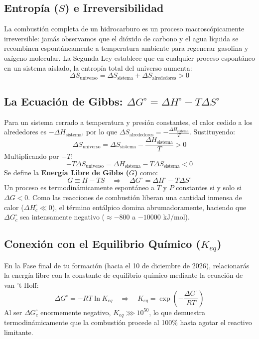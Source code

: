 \documentclass[11pt,letterpaper]{report}
\begin{document}
\subsection{Entropía ($S$) e Irreversibilidad}
La combustión completa de un hidrocarburo es un proceso macroscópicamente irreversible: jamás observamos que el dióxido de carbono y el agua líquida se recombinen espontáneamente a temperatura ambiente para regenerar gasolina y oxígeno molecular. La Segunda Ley establece que en cualquier proceso espontáneo en un sistema aislado, la entropía total del universo aumenta:
\begin{equation}
    \Delta S_{\text{universo}} = \Delta S_{\text{sistema}} + \Delta S_{\text{alrededores}} > 0
\end{equation}

\subsection{La Ecuación de Gibbs: $\Delta G^\circ = \Delta H^\circ - T\Delta S^\circ$}
Para un sistema cerrado a temperatura y presión constantes, el calor cedido a los alrededores es $-\Delta H_{\text{sistema}}$, por lo que $\Delta S_{\text{alrededores}} = -\frac{\Delta H_{\text{sistema}}}{T}$. Sustituyendo:
\begin{equation}
    \Delta S_{\text{universo}} = \Delta S_{\text{sistema}} - \frac{\Delta H_{\text{sistema}}}{T} > 0
\end{equation}
Multiplicando por $-T$:
\begin{equation}
    -T \Delta S_{\text{universo}} = \Delta H_{\text{sistema}} - T \Delta S_{\text{sistema}} < 0
\end{equation}
Se define la \textbf{Energía Libre de Gibbs ($G$)} como:
\begin{equation}
    G \equiv H - TS \quad \Longrightarrow \quad \Delta G^\circ = \Delta H^\circ - T\Delta S^\circ
\end{equation}
Un proceso es termodinámicamente espontáneo a $T$ y $P$ constantes si y solo si $\Delta G < 0$. Como las reacciones de combustión liberan una cantidad inmensa de calor ($\Delta H_c^\circ \ll 0$), el término entálpico domina abrumadoramente, haciendo que $\Delta G_c^\circ$ sea intensamente negativo ($\approx -800$ a $-10000\text{ kJ/mol}$).

\subsection{Conexión con el Equilibrio Químico ($K_{eq}$)}
En la Fase final de tu formación (hacia el 10 de diciembre de 2026), relacionarás la energía libre con la constante de equilibrio químico mediante la ecuación de van 't Hoff:
\begin{equation}
    \Delta G^\circ = -RT \ln K_{eq} \quad \Longrightarrow \quad K_{eq} = \exp\left(-\frac{\Delta G^\circ}{RT}\right)
\end{equation}
Al ser $\Delta G_c^\circ$ enormemente negativo, $K_{eq} \ggg 10^{50}$, lo que demuestra termodinámicamente que la combustión procede al 100\% hasta agotar el reactivo limitante.
\end{document}
